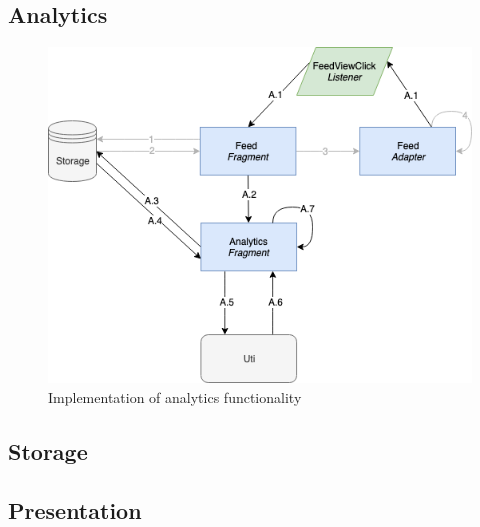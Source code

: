 \subsection{Analytics}
\begin{figure}
    \centering
    \includegraphics[scale=0.6]{images/Anal_Imp.png}
    \caption{Implementation of analytics functionality}
    \label{fig:impl_analytics}
\end{figure}


\subsection{Storage}
\subsection{Presentation}

